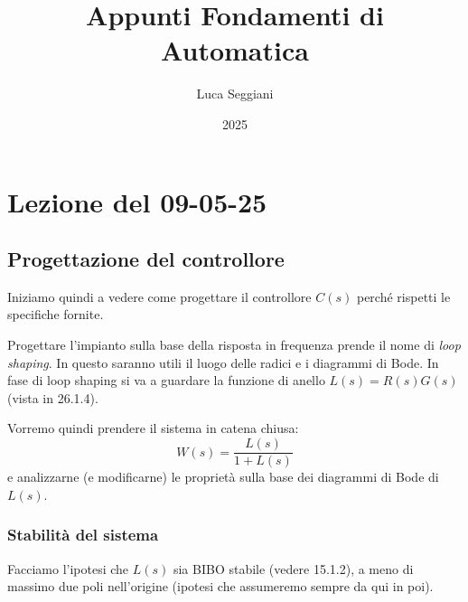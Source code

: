 \documentclass[a4paper,11pt]{article}
\title{Appunti Fondamenti di Automatica}
\author{Luca Seggiani}
\date{2025}
\begin{document}
\section{Lezione del 09-05-25}

\thispagestyle{empty}
\pagestyle{fancy}

\subsection{Progettazione del controllore}
Iniziamo quindi a vedere come progettare il controllore $C(s)$ perché rispetti le specifiche fornite.

Progettare l'impianto sulla base della risposta in frequenza prende il nome di \textit{loop shaping}.
In questo saranno utili il luogo delle radici e i diagrammi di Bode.
In fase di loop shaping si va a guardare la funzione di anello $L(s) = R(s)G(s)$ (vista in 26.1.4).

Vorremo quindi prendere il sistema in catena chiusa:
$$
W(s) = \frac{L(s)}{1 + L(s)}
$$
e analizzarne (e modificarne) le proprietà sulla base dei diagrammi di Bode di $L(s)$.

\subsubsection{Stabilità del sistema}

Facciamo l'ipotesi che $L(s)$ sia BIBO stabile (vedere 15.1.2), a meno di massimo due poli nell'origine (ipotesi che assumeremo sempre da qui in poi).
\end{document}
